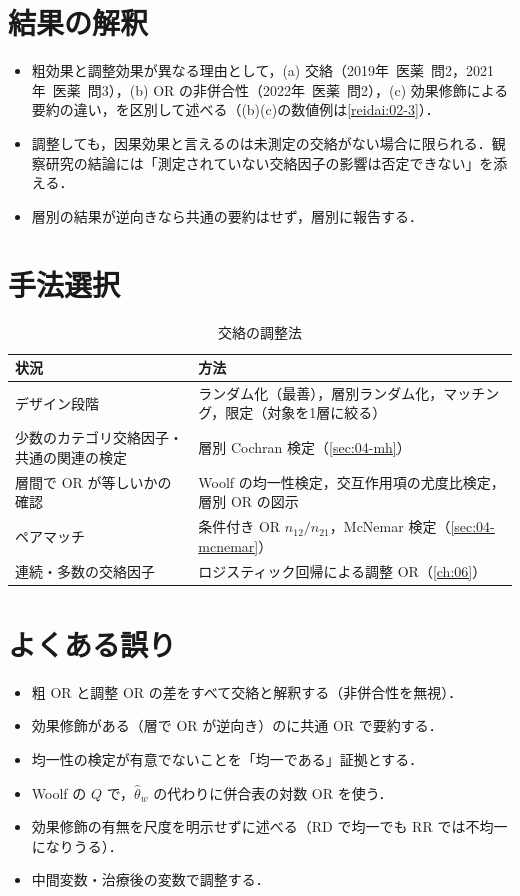 \documentclass[a4paper,11pt,openany]{ltjsbook}
\newcommand{\kakomon}[2]{\mbox{#1年 医薬 問#2}}
\begin{document}
\section{結果の解釈}\label{sec:07-interp}
\begin{itemize}
\item 粗効果と調整効果が異なる理由として，(a) 交絡（\kakomon{2019}{2}，\kakomon{2021}{3}），(b) OR の非併合性（\kakomon{2022}{2}），(c) 効果修飾による要約の違い，を区別して述べる（(b)(c)の数値例は\cref{reidai:02-3}）．
\item 調整しても，因果効果と言えるのは未測定の交絡がない場合に限られる．観察研究の結論には「測定されていない交絡因子の影響は否定できない」を添える．
\item 層別の結果が逆向きなら共通の要約はせず，層別に報告する．
\end{itemize}

\section{手法選択}\label{sec:07-choice}
\begin{table}[htbp]
\centering\small
\caption{交絡の調整法}\label{tab:07-choice}
\begin{tabular}{@{}L{48mm}L{87mm}@{}}
\toprule
状況 & 方法\\
\midrule
デザイン段階 & ランダム化（最善），層別ランダム化，マッチング，限定（対象を1層に絞る）\\
少数のカテゴリ交絡因子・共通の関連の検定 & 層別 Cochran 検定（\cref{sec:04-mh}）\\
層間で OR が等しいかの確認 & Woolf の均一性検定，交互作用項の尤度比検定，層別 OR の図示\\
ペアマッチ & 条件付き OR $n_{12}/n_{21}$，McNemar 検定（\cref{sec:04-mcnemar}）\\
連続・多数の交絡因子 & ロジスティック回帰による調整 OR（\cref{ch:06}）\\
\bottomrule
\end{tabular}
\end{table}

\section{よくある誤り}\label{sec:07-err}
\begin{warnbox}
\begin{itemize}
\item 粗 OR と調整 OR の差をすべて交絡と解釈する（非併合性を無視）．
\item 効果修飾がある（層で OR が逆向き）のに共通 OR で要約する．
\item 均一性の検定が有意でないことを「均一である」証拠とする．
\item Woolf の $Q$ で，$\hat\theta_w$ の代わりに併合表の対数 OR を使う．
\item 効果修飾の有無を尺度を明示せずに述べる（RD で均一でも RR では不均一になりうる）．
\item 中間変数・治療後の変数で調整する．
\end{itemize}
\end{warnbox}
\end{document}
